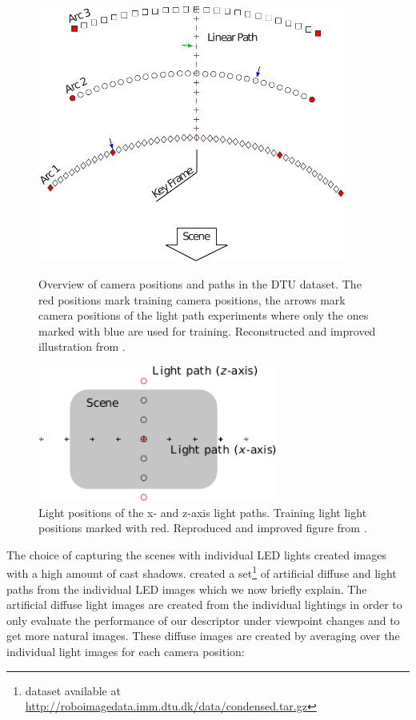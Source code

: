 \documentclass[thesis.tex]{subfiles}
\begin{document}
\begin{figure}[p]
	\centering
	\includegraphics[width=0.9\textwidth]{img/CameraPosbOwn.pdf}
	\caption{Overview of camera positions and paths in the DTU dataset. The red positions mark training camera positions, the arrows mark camera positions of the light path experiments where only the ones marked with blue are used for training. Reconstructed and improved illustration from \citet[Figure 3, pp. 3]{aanaes2010recall}.}
	\label{fig:dtu_overview}
	\vspace{1cm}
	\centering
	\includegraphics[width=0.7\textwidth]{img/dtu_light_overview.pdf}
	\caption{Light positions of the x- and z-axis light paths. Training light light positions marked with red. Reproduced and improved figure from \citet[Fig. 1, pp. 644]{larsen2012in}.}
	\label{fig:dtu_light_overview}
\end{figure}
%
The choice of capturing the scenes with individual LED lights created images with a high amount of cast shadows. \citet{larsen2012jet} created a set\footnote{dataset available at \url{http://roboimagedata.imm.dtu.dk/data/condensed.tar.gz}} of artificial diffuse and light paths from the individual LED images which we now briefly explain. The artificial diffuse light images are created from the individual lightings in order to only evaluate the performance of our descriptor under viewpoint changes and to get more natural images. These diffuse images are created by averaging over the individual light images for each camera position:
\end{document}
